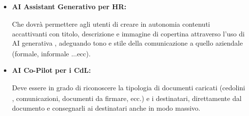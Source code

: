 \documentclass[a4paper,11pt]{article}
\begin{document}
\begin{itemize}
\item \textbf{AI\textsubscript{}
 Assistant Generativo per HR:} \\
\begin{minipage}[t]{\dimexpr\linewidth-2em}
Che dovrà permettere agli utenti di creare in autonomia contenuti accattivanti con titolo, descrizione e immagine di copertina attraverso l'uso di AI\textsubscript{}
 generativa\textsubscript{}
, adeguando tono e stile della comunicazione a quello aziendale (formale, informale ...ecc).
\end{minipage}

\item \textbf{AI\textsubscript{}
 Co-Pilot\textsubscript{} per i CdL\textsubscript{}:} \\
\begin{minipage}[t]{\dimexpr\linewidth-2em}
Deve essere in grado di riconoscere la tipologia di documenti caricati (cedolini\textsubscript{}
, comunicazioni, documenti da firmare, ecc.) e i destinatari, direttamente dal documento e consegnarli ai destinatari anche in modo massivo.
\end{minipage}
\end{itemize}
\end{document}
